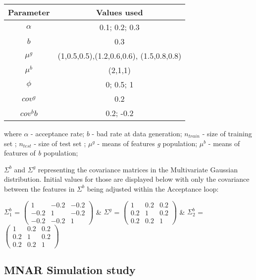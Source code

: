 \documentclass[11pt,a4paper]{article}
\begin{document}
\begin{center}
\begin{tabular}{||c c||} 
 \hline
 Parameter & Values used \\ [0.5ex] 
 \hline\hline
 $\alpha$ & 0.1; 0.2; 0.3\\ 
 \hline
 $b$ & 0.3\\ 
 \hline
 $\mu^g$ & (1,0.5,0.5),(1.2,0.6,0.6), (1.5,0.8,0.8)\\ 
 \hline
 $\mu^b$ & (2,1,1)\\ 
 \hline
 $\phi$ & 0; 0.5; 1\\ 
 \hline
 $cov^g$ & 0.2\\ 
 \hline
 $cov^bb$ & 0.2; -0.2\\ 
 \hline
\end{tabular}
\end{center}

where
$\alpha$ - acceptance rate;
$b$ - bad rate at data generation;
$n_{train}$ - size of training set ;
$n_{test}$ - size of test set ;
$\mu^g$ - means of features \textit{g} population; 
$\mu^b$ - means of features of \textit{b} population; 


\vspace{5mm} %

$\Sigma^b$ and $\Sigma^g$ representing the covariance matrices in the Multivariate Gaussian distribution. Initial values for those are displayed below with only the covariance between the features in $\Sigma^b$ being adjusted within the Acceptance loop:
\vspace{5mm}

$\Sigma^b_1$ = 
$\begin{pmatrix}
1 & -0.2 & -0.2\\
-0.2 & 1 & -0.2\\
-0.2 & -0.2 & 1
\end{pmatrix}$ 
&
$\Sigma^g$ = 
$\begin{pmatrix}
1 & 0.2 & 0.2\\
0.2 & 1 & 0.2\\
0.2 & 0.2 & 1
\end{pmatrix}$
&
$\Sigma^b_2$ = 
$\begin{pmatrix}
1 & 0.2 & 0.2\\
0.2 & 1 & 0.2\\
0.2 & 0.2 & 1
\end{pmatrix}$


\subsection{MNAR Simulation study} \label{mnarsim}
\end{document}
